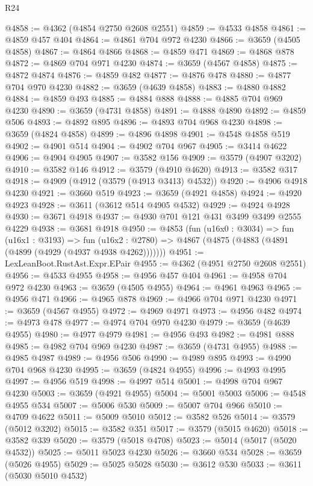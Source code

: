 \begin{lexlean}{R24}
\begin{coremodule}
@4858 := @4362 (@4854 @2750 @2608 @2551)
@4859 := @4533 @4858
@4861 := @4859 @457 @404
@4864 := @4861 @704 @972 @4230
@4866 := @3659 (@4505 @4858)
@4867 := @4864 @4866
@4868 := @4859 @471
@4869 := @4868 @878
@4872 := @4869 @704 @971 @4230
@4874 := @3659 (@4567 @4858)
@4875 := @4872 @4874
@4876 := @4859 @482
@4877 := @4876 @478
@4880 := @4877 @704 @970 @4230
@4882 := @3659 (@4639 @4858)
@4883 := @4880 @4882
@4884 := @4859 @493
@4885 := @4884 @888
@4888 := @4885 @704 @969 @4230
@4890 := @3659 (@4731 @4858)
@4891 := @4888 @4890
@4892 := @4859 @506
@4893 := @4892 @895
@4896 := @4893 @704 @968 @4230
@4898 := @3659 (@4824 @4858)
@4899 := @4896 @4898
@4901 := @4548 @4858 @519
@4902 := @4901 @514
@4904 := @4902 @704 @967
@4905 := @3414 @4622
@4906 := @4904 @4905
@4907 := @3582 @156
@4909 := @3579 (@4907 @3202)
@4910 := @3582 @146
@4912 := @3579 (@4910 @4620)
@4913 := @3582 @317
@4918 := @4909 (@4912 (@3579 (@4913 @3413) @4532))
@4920 := @4906 @4918 @4230
@4921 := @3660 @519
@4923 := @3659 (@4921 @4858)
@4924 := @4920 @4923
@4928 := @3611 (@3612 @514 @4905 @4532)
@4929 := @4924 @4928
@4930 := @3671 @4918
@4937 := @4930 @701 @121 @431 @3499 @3499 @2555 @4229
@4938 := @3681 @4918
@4950 := @4853
    (fun (u16x0 : @3034) =>
    fun (u16x1 : @3193) =>
    fun (u16x2 : @2780) => @4867 (@4875 (@4883 (@4891 (@4899 (@4929 (@4937 @4938 @4262)))))))
@4951 := LexLeanBoot.RustAst.Expr.EPair
@4955 := @4362 (@4951 @2750 @2608 @2551)
@4956 := @4533 @4955
@4958 := @4956 @457 @404
@4961 := @4958 @704 @972 @4230
@4963 := @3659 (@4505 @4955)
@4964 := @4961 @4963
@4965 := @4956 @471
@4966 := @4965 @878
@4969 := @4966 @704 @971 @4230
@4971 := @3659 (@4567 @4955)
@4972 := @4969 @4971
@4973 := @4956 @482
@4974 := @4973 @478
@4977 := @4974 @704 @970 @4230
@4979 := @3659 (@4639 @4955)
@4980 := @4977 @4979
@4981 := @4956 @493
@4982 := @4981 @888
@4985 := @4982 @704 @969 @4230
@4987 := @3659 (@4731 @4955)
@4988 := @4985 @4987
@4989 := @4956 @506
@4990 := @4989 @895
@4993 := @4990 @704 @968 @4230
@4995 := @3659 (@4824 @4955)
@4996 := @4993 @4995
@4997 := @4956 @519
@4998 := @4997 @514
@5001 := @4998 @704 @967 @4230
@5003 := @3659 (@4921 @4955)
@5004 := @5001 @5003
@5006 := @4548 @4955 @534
@5007 := @5006 @530
@5009 := @5007 @704 @966
@5010 := @4709 @4622
@5011 := @5009 @5010
@5012 := @3582 @526
@5014 := @3579 (@5012 @3202)
@5015 := @3582 @351
@5017 := @3579 (@5015 @4620)
@5018 := @3582 @339
@5020 := @3579 (@5018 @4708)
@5023 := @5014 (@5017 (@5020 @4532))
@5025 := @5011 @5023 @4230
@5026 := @3660 @534
@5028 := @3659 (@5026 @4955)
@5029 := @5025 @5028
@5030 := @3612 @530
@5033 := @3611 (@5030 @5010 @4532)

\end{coremodule}
\end{lexlean}
